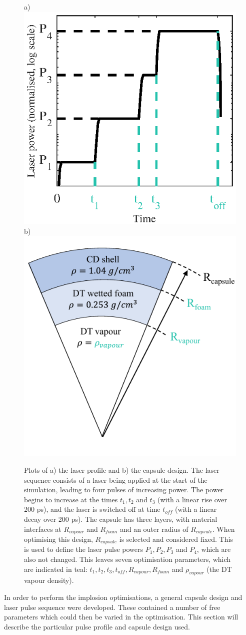 \begin{figure} 
\centering     %
\subfigure a)\includegraphics[width=.45\textwidth]{figures/LowCR/LaserProfile_half.eps}
\subfigure b)\includegraphics[width=.45\textwidth]{figures/LowCR/Capsule.pdf}
\caption{\label{fig:CapsuleAndLaserProfile}Plots of a) the laser profile and b) the capsule design. The laser sequence consists of a laser being applied at the start of the simulation, leading to four pulses of increasing power. The power begins to increase at the times $t_1, t_2$ and $t_3$ (with a linear rise over 200 \unit{\pico\second}), and the laser is switched off at time $t_{off}$ (with a linear decay over 200 \unit{\pico\second}). The capsule has three layers, with material interfaces at  $R_{vapour}$ and $R_{foam}$ and an outer radius of $R_{capsule}$. When optimising this design, $R_{capsule}$ is selected and considered fixed. This is used to define the laser pulse powers $P_1, P_2, P_3$ and $P_4$, which are also not changed. This leaves seven optimisation parameters, which are indicated in teal: $t_1, t_2, t_3, t_{off}, R_{vapour}, R_{foam}$ and $\rho_{vapour}$ (the DT vapour density).}
\end{figure}

In order to perform the implosion optimisations, a general capsule design and laser pulse sequence were developed. These contained a number of free parameters which could then be varied in the optimisation. This section will describe the particular pulse profile and capsule design used.

